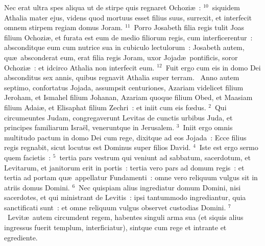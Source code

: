  Nec erat ultra spes aliqua ut de stirpe quis regnaret Ochozi\ae~:
${}^{10}$~siquidem Athalia mater ejus, videns quod mortuus esset filius suus, surrexit, et interfecit omnem stirpem regiam domus Joram.
${}^{11}$~Porro Josabeth filia regis tulit Joas filium Ochozi\ae , et furata est eum de medio filiorum regis, cum interficerentur~: absconditque eum cum nutrice sua in cubiculo lectulorum~: Josabeth autem, qu\ae\ absconderat eum, erat filia regis Joram, uxor Jojad\ae\ pontificis, soror Ochozi\ae~: et idcirco Athalia non interfecit eum.
${}^{12}$~Fuit ergo cum eis in domo Dei absconditus sex annis, quibus regnavit Athalia super terram.
~Anno autem septimo, confortatus Jojada, assumpsit centuriones, Azariam videlicet filium Jeroham, et Ismahel filium Johanan, Azariam quoque filium Obed, et Maasiam filium Adai\ae , et Elisaphat filium Zechri~: et iniit cum eis fœdus.
${}^{2}$~Qui circumeuntes Judam, congregaverunt Levitas de cunctis urbibus Juda, et principes familiarum Isra\"el, veneruntque in Jerusalem.
${}^{3}$~Iniit ergo omnis multitudo pactum in domo Dei cum rege, dixitque ad eos Jojada~: Ecce filius regis regnabit, sicut locutus est Dominus super filios David.
${}^{4}$~Iste est ergo sermo quem facietis~:
${}^{5}$~tertia pars vestrum qui veniunt ad sabbatum, sacerdotum, et Levitarum, et janitorum erit in portis~: tertia vero pars ad domum regis~: et tertia ad portam qu\ae\ appellatur Fundamenti~: omne vero reliquum vulgus sit in atriis domus Domini.
${}^{6}$~Nec quispiam alius ingrediatur domum Domini, nisi sacerdotes, et qui ministrant de Levitis~: ipsi tantummodo ingrediantur, quia sanctificati sunt~: et omne reliquum vulgus observet custodias Domini.
${}^{7}$~Levit\ae\ autem circumdent regem, habentes singuli arma sua (et siquis alius ingressus fuerit templum, interficiatur), sintque cum rege et intrante et egrediente.


